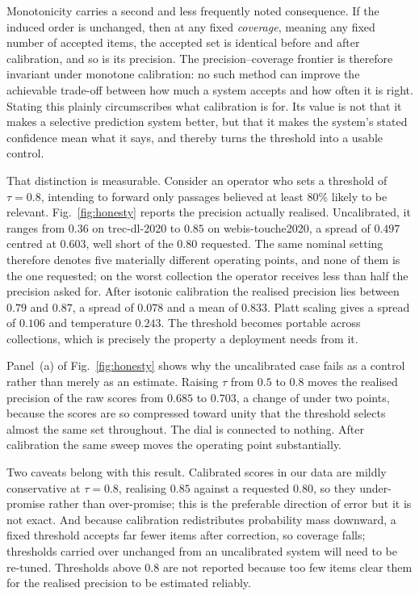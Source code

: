 \documentclass[sn-mathphys-num,pdflatex]{sn-jnl}
\begin{document}
Monotonicity carries a second and less frequently noted consequence. If the induced
order is unchanged, then at any fixed \emph{coverage}, meaning any fixed number of
accepted items, the accepted set is identical before and after calibration, and so
is its precision. The precision--coverage frontier is therefore invariant under
monotone calibration: no such method can improve the achievable trade-off between
how much a system accepts and how often it is right. Stating this plainly
circumscribes what calibration is for. Its value is not that it makes a selective
prediction system better, but that it makes the system's stated confidence mean what
it says, and thereby turns the threshold into a usable control.

That distinction is measurable. Consider an operator who sets a threshold of
$\tau=0.8$, intending to forward only passages believed at least $80\%$ likely to be
relevant. Fig.~\ref{fig:honesty} reports the precision actually realised.
Uncalibrated, it ranges from $0.36$ on trec-dl-2020 to $0.85$ on webis-touche2020, a
spread of $0.497$ centred at $0.603$, well short of the $0.80$ requested. The same
nominal setting therefore denotes five materially different operating points, and
none of them is the one requested; on the worst collection the operator receives less
than half the precision asked for. After isotonic calibration the realised precision
lies between $0.79$ and $0.87$, a spread of $0.078$ and a mean of $0.833$. Platt
scaling gives a spread of $0.106$ and temperature $0.243$. The threshold becomes
portable across collections, which is precisely the property a deployment needs from
it.

Panel~(a) of Fig.~\ref{fig:honesty} shows why the uncalibrated case fails as a
control rather than merely as an estimate. Raising $\tau$ from $0.5$ to $0.8$ moves
the realised precision of the raw scores from $0.685$ to $0.703$, a change of under
two points, because the scores are so compressed toward unity that the threshold
selects almost the same set throughout. The dial is connected to nothing. After
calibration the same sweep moves the operating point substantially.

Two caveats belong with this result. Calibrated scores in our data are mildly
conservative at $\tau = 0.8$, realising $0.85$ against a requested $0.80$, so they
under-promise rather than over-promise; this is the preferable direction of error
but it is not exact. And because calibration redistributes probability mass
downward, a fixed threshold accepts far fewer items after correction, so coverage
falls; thresholds carried over unchanged from an uncalibrated system will need to be
re-tuned. Thresholds above $0.8$ are not reported because too few items clear them
for the realised precision to be estimated reliably.
\end{document}
